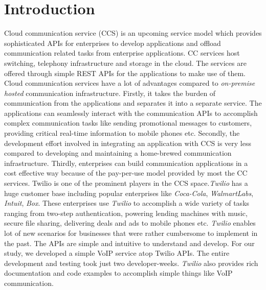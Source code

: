 \section{Introduction}
\label{sec-intro}
Cloud communication service (CCS) is an upcoming service model which provides sophisticated APIs for enterprises to develop applications and offload communication related tasks from enterprise applications. CC services host switching, telephony infrastructure and storage in the cloud. The services are offered through simple REST APIs for the applications to make use of them. Cloud communication services have a lot of advantages compared to \textit{on-premise hosted} communication infrastructure. Firstly, it takes the burden of communication from the applications and separates it into a separate service. The applications can seamlessly interact with the communication APIs to accomplish complex communication tasks like sending promotional messages to customers, providing critical real-time information to mobile phones etc. Secondly, the development effort involved in integrating an application with CCS is very less compared to developing and maintaining a home-brewed communication infrastructure.
Thirdly, enterprises can build communication applications in a cost effective way because of the pay-per-use model provided by most the CC services. {Twilio} is one of the prominent players in the CCS space.\textit{Twilio} has a huge customer base  including popular enterprises like \textit{Coca-Cola}, \textit{WalmartLabs}, \textit{Intuit}, \textit{Box}. These enterprises use \textit{Twilio} to accomplish a wide variety of tasks ranging from two-step authentication, powering lending machines with music, secure file sharing, delivering deals and ads to mobile phones etc. \textit{Twilio} enables lot of new scenarios for businesses that were rather cumbersome to implement in the past. The APIs are simple and intuitive to understand and develop. For our study, we developed a simple VoIP service atop Twilio APIs. The entire development and testing took just two developer-weeks. \textit{Twilio} also provides rich documentation and code examples to accomplish simple things like VoIP communication.
